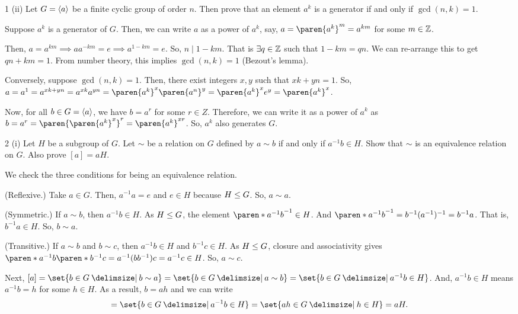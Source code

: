 \documentclass[11pt]{penrose}
\begin{document}
\begin{problem}{1 (ii)}
    Let $G = \langle a\rangle$ be a finite cyclic group of order $n$. Then prove that an element $a^k$ is a generator if and only if $\gcd(n, k) = 1$.

    \solution Suppose $a^k$ is a generator of $G$. Then, we can write $a$ as a power of $a^k$, say, $a = \paren{a^k}^m = a^{km}$ for some $m \in \mathbb{Z}$.

    Then, $a = a^{km} \implies a a^{-km} = e \implies a^{1-km} = e$. So, $n \mid 1 - km$. That is $\exists q \in \mathbb{Z}$ such that $1 - km = qn$. We can re-arrange this to get $qn + km = 1$. From number theory, this implies $\gcd(n,k)=1$ (Bezout's lemma).

    Conversely, suppose $\gcd(n,k)=1$. Then, there exist integers $x, y$ such that $xk + yn = 1$. So, $a = a^1 = a^{xk + yn} = a^{xk} a^{yn} = \paren{a^{k}}^{x} \paren{a^{n}}^{y} = \paren{a^{k}}^{x} e^{y} = \paren{a^{k}}^{x}$.

    Now, for all $b \in G=\langle a\rangle$, we have $b = a^r$ for some $r \in Z$. Therefore, we can write it as a power of $a^k$ as $b = a^r = \paren{\paren{a^{k}}^{x}}^{r} = \paren{a^{k}}^{xr}$. So, $a^k$ also generates $G$.
\end{problem}

\begin{problem}{2 (i)}
    Let $H$ be a subgroup of $G$. Let $\sim$ be a relation on $G$ defined by $a \sim b$ if and only if $a^{-1} b \in H$. Show that $\sim$ is an equivalence relation on $G$. Also prove $[a] = aH$.

    \solution We check the three conditions for being an equivalence relation.
    
    (Reflexive.) Take $a \in G$. Then, $a^{-1} a = e$ and $e \in H$ because $H \mathrel{\leq} G$. So, $a \sim a$.

    (Symmetric.) If $a \sim b$, then $a^{-1} b \in H$. As $H \mathrel{\leq} G$, the element $\paren*{a^{-1} b}^{-1} \in H$. And $\paren*{a^{-1} b}^{-1} = b^{-1} (a^{-1})^{-1} = b^{-1} a$. That is, $b^{-1} a \in H$. So, $b \sim a$.

    (Transitive.) If $a \sim b$ and $b \sim c$, then $a^{-1} b \in H$ and $b^{-1} c \in H$. As $H \mathrel{\leq} G$, closure and associativity gives $\paren*{a^{-1} b} \paren*{b^{-1} c} = a^{-1} (b b^{-1}) c = a^{-1} c \in H$. So, $a \sim c$.

    Next, $[a] = \set{b \in G \st b \sim a} = \set{b \in G \st a \sim b} = \set{b \in G \st a^{-1} b \in H}$. And, $a^{-1} b \in H$ means $a^{-1} b = h$ for some $h \in H$. As a result, $b = ah$ and we can write
    \begin{equation*}
        [a] = \set{b \in G \st a^{-1} b \in H} = \set{ah \in G \st h \in H} = aH.
    \end{equation*}
\end{problem}
\end{document}
